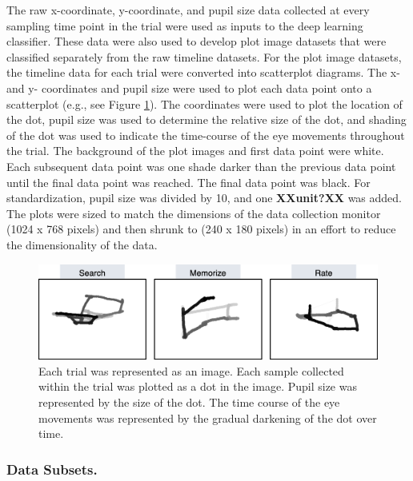 \documentclass[
  english,
  man,floatsintext]{apa6}
\begin{document}
The raw x-coordinate, y-coordinate, and pupil size data collected at every sampling time point in the trial were used as inputs to the deep learning classifier. These data were also used to develop plot image datasets that were classified separately from the raw timeline datasets. For the plot image datasets, the timeline data for each trial were converted into scatterplot diagrams. The x- and y- coordinates and pupil size were used to plot each data point onto a scatterplot (e.g., see Figure \ref{fig:ave-condition}). The coordinates were used to plot the location of the dot, pupil size was used to determine the relative size of the dot, and shading of the dot was used to indicate the time-course of the eye movements throughout the trial. The background of the plot images and first data point were white. Each subsequent data point was one shade darker than the previous data point until the final data point was reached. The final data point was black. For standardization, pupil size was divided by 10, and one \textbf{XXunit?XX} was added. The plots were sized to match the dimensions of the data collection monitor (1024 x 768 pixels) and then shrunk to (240 x 180 pixels) in an effort to reduce the dimensionality of the data.

\begin{figure}
\centering
\includegraphics{figures/cond_imgs.png}
\caption{\label{fig:ave-condition}Each trial was represented as an image. Each sample collected within the trial was plotted as a dot in the image. Pupil size was represented by the size of the dot. The time course of the eye movements was represented by the gradual darkening of the dot over time.}
\end{figure}

\subsubsection{Data Subsets.}
\end{document}

